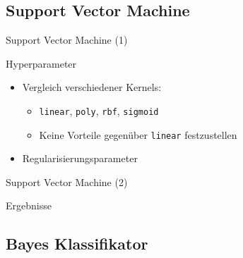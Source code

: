 \documentclass[aspectratio=169]{beamer} %
\begin{document}
\subsection{Support Vector Machine}

\begin{frame}{Support Vector Machine (1)}
    \begin{block}{Hyperparameter}
        \begin{itemize}
            \item Vergleich verschiedener Kernels:
                \begin{itemize}
                    \item \texttt{linear}, \texttt{poly}, \texttt{rbf}, \texttt{sigmoid}
                    
                    \item Keine Vorteile gegen\"uber \texttt{linear} festzustellen
                \end{itemize}

            \item Regularisierungsparameter
        \end{itemize}
    \end{block}
\end{frame}

\begin{frame}{Support Vector Machine (2)}
    \begin{block}{Ergebnisse}
        \begin{figure}
            \centering
            
            \qquad
        \end{figure}
    \end{block}
\end{frame}

\subsection{Bayes Klassifikator}
\end{document}
